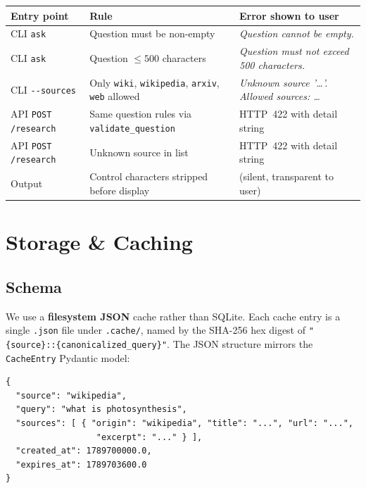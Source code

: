 \documentclass[11pt,a4paper]{article}
\begin{document}
\begin{center}\small
\begin{tabular}{lll}
\toprule
\textbf{Entry point} & \textbf{Rule} & \textbf{Error shown to user} \\
\midrule
CLI \texttt{ask} & Question must be non-empty & \textit{Question cannot be empty.} \\
CLI \texttt{ask} & Question $\leq 500$ characters & \textit{Question must not exceed 500 characters.} \\
CLI \texttt{-{}-sources} & Only \texttt{wiki}, \texttt{wikipedia}, \texttt{arxiv}, \texttt{web} allowed & \textit{Unknown source '\ldots'. Allowed sources: \ldots} \\
API \texttt{POST /research} & Same question rules via \texttt{validate\_question} & HTTP~422 with detail string \\
API \texttt{POST /research} & Unknown source in list & HTTP~422 with detail string \\
Output & Control characters stripped before display & (silent, transparent to user) \\
\bottomrule
\end{tabular}
\end{center}

\section{Storage \& Caching}\label{sec:storage}

\subsection{Schema}

We use a \textbf{filesystem JSON} cache rather than SQLite. Each cache entry is a single \texttt{.json} file under \texttt{.cache/}, named by the SHA-256 hex digest of \texttt{"\{source\}::\{canonicalized\_query\}"}. The JSON structure mirrors the \texttt{CacheEntry} Pydantic model:

\begin{lstlisting}[style=python,numbers=none,basicstyle=\ttfamily\small]
{
  "source": "wikipedia",
  "query": "what is photosynthesis",
  "sources": [ { "origin": "wikipedia", "title": "...", "url": "...",
                  "excerpt": "..." } ],
  "created_at": 1789700000.0,
  "expires_at": 1789703600.0
}
\end{lstlisting}
\end{document}
